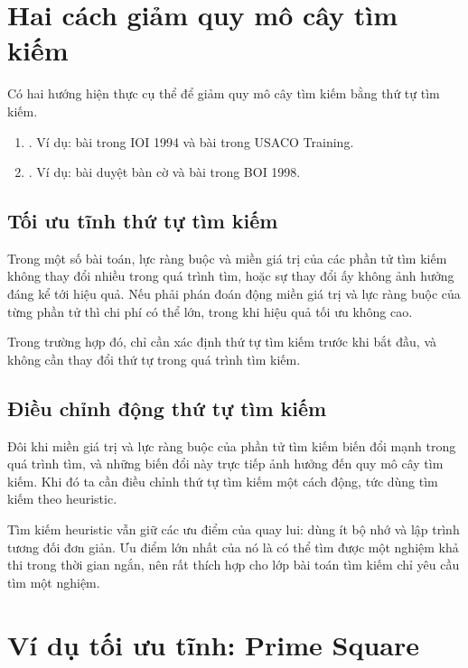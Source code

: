 \documentclass[11pt]{article}
\begin{document}
\section{Hai cách giảm quy mô cây tìm kiếm}

Có hai hướng hiện thực cụ thể để giảm quy mô cây tìm kiếm bằng thứ tự tìm kiếm.

\begin{enumerate}
  \item {}. Ví dụ: bài 
  trong IOI 1994 và bài  trong USACO Training.
  \item {}. Ví dụ: bài duyệt bàn cờ và
  bài  trong BOI 1998.
\end{enumerate}

\subsection{Tối ưu tĩnh thứ tự tìm kiếm}

Trong một số bài toán, lực ràng buộc và miền giá trị của các phần tử tìm kiếm
không thay đổi nhiều trong quá trình tìm, hoặc sự thay đổi ấy không ảnh hưởng
đáng kể tới hiệu quả. Nếu phải phán đoán động miền giá trị và lực ràng buộc
của từng phần tử thì chi phí có thể lớn, trong khi hiệu quả tối ưu không cao.

Trong trường hợp đó, chỉ cần xác định thứ tự tìm kiếm trước khi bắt đầu, và
không cần thay đổi thứ tự trong quá trình tìm kiếm.

\subsection{Điều chỉnh động thứ tự tìm kiếm}

Đôi khi miền giá trị và lực ràng buộc của phần tử tìm kiếm biến đổi mạnh trong
quá trình tìm, và những biến đổi này trực tiếp ảnh hưởng đến quy mô cây tìm
kiếm. Khi đó ta cần điều chỉnh thứ tự tìm kiếm một cách động, tức dùng tìm
kiếm theo heuristic.

Tìm kiếm heuristic vẫn giữ các ưu điểm của quay lui: dùng ít bộ nhớ và lập
trình tương đối đơn giản. Ưu điểm lớn nhất của nó là có thể tìm được một
nghiệm khả thi trong thời gian ngắn, nên rất thích hợp cho lớp bài toán tìm
kiếm chỉ yêu cầu tìm một nghiệm.

\section{Ví dụ tối ưu tĩnh: Prime Square}
\end{document}
